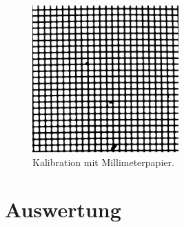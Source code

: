 \documentclass[numbers=noenddot,a4paper,notitlepage,twoside,BCOR15mm]{scrartcl}
\begin{document}
				\begin{figure}[H]
					\centering\includegraphics[width=0.5\textwidth]{figs/0-1.png}
					\caption{Kalibration mit Millimeterpapier.}\label{img:milli}
				\end{figure}

	\newpage
	\section{Auswertung}
\end{document}
